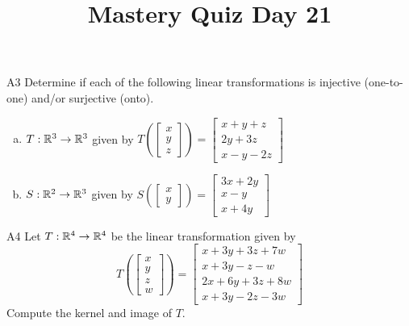 \documentclass{sbgLAquiz}
\title{Mastery Quiz Day 21 }
\begin{document}
\begin{problem}{A3}
Determine if each of the following linear transformations is injective (one-to-one) and/or surjective (onto).
\begin{enumerate}[(a)]
\item $T: \mathbb{R}^3 \rightarrow \mathbb{R}^3$ given by $T\left(\begin{bmatrix} x \\ y \\ z  \end{bmatrix} \right) = \begin{bmatrix} x+y+z \\ 2y+3z \\ x-y-2z \end{bmatrix} $
\item $S: \mathbb{R}^2 \rightarrow \mathbb{R}^3$ given by $S\left(\begin{bmatrix} x \\ y  \end{bmatrix} \right) = \begin{bmatrix} 3x+2y \\ x-y \\ x+4y \end{bmatrix} $
\end{enumerate}
\end{problem}

\begin{problem}{A4}
Let $T: \mathbb{R}^4\rightarrow \mathbb{R}^4$ be the linear transformation given by $$T\left(\begin{bmatrix} x \\ y \\ z \\ w \end{bmatrix} \right) = \begin{bmatrix} x+3y+3z+7w \\ x+3y-z-w \\ 2x+6y+3z+8w \\ x+3y-2z-3w \end{bmatrix}$$
Compute the kernel and image of $T$.
\end{problem}
\end{document}
